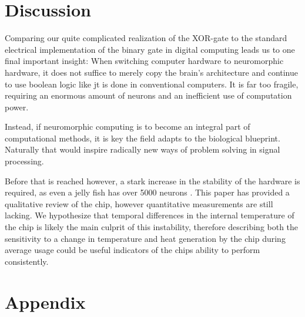 \documentclass[a4paper,twocolumn]{article}
\begin{document}
\section{Discussion}
Comparing our quite complicated realization of the XOR-gate to the standard
electrical implementation of the binary gate in digital computing leads us to
one final important insight: When switching computer hardware to neuromorphic
hardware, it does not suffice to merely copy the brain's architecture and
continue to use boolean logic like jt is done in conventional computers. It is far too
fragile, requiring an enormous amount of neurons and an inefficient use of
computation power.

Instead, if neuromorphic computing is to become an integral part of
computational methods, it is key the field adapts to the biological blueprint.
Naturally that would inspire radically new ways of problem solving in signal
processing.

Before that is reached however, a stark increase in the stability of the
hardware is required, as even a jelly fish has over 5000 neurons
\cite{neuronsjellyfish}. This paper has provided a qualitative review of the
chip, however quantitative measurements are still lacking. We hypothesize that
temporal differences in the internal temperature of the chip is likely the main
culprit of this instability, therefore describing both the sensitivity to a
change in temperature and heat generation by the chip during average usage could
be useful indicators of the chips ability to perform consistently.





\section{Appendix}
\end{document}
